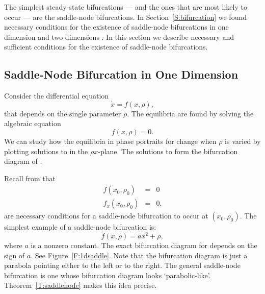 \documentclass{ximera}
\begin{document}
\label{S:SNB}
  


The simplest steady-state bifurcations --- and the ones that are most
likely to occur --- are the saddle-node bifurcations.  In 
Section~\ref{S:bifurcation} we found necessary conditions for the existence 
of saddle-node bifurcations in one dimension  and two 
dimensions .  In this section we describe necessary and 
sufficient conditions for the existence of saddle-node bifurcations.


\subsection*{Saddle-Node Bifurcation in One Dimension}

Consider the differential equation 
\begin{equation} \label{e:1dbif}
\dot{x} = f(x,\rho),
\end{equation}
that depends on the single parameter $\rho$.  The equilibria are 
found by solving the algebraic equation 
\begin{equation} \label{e:1dstst}
f(x,\rho) = 0.
\end{equation}
We can study how the equilibria in phase portraits for  
change when $\rho$ is varied by plotting
solutions to  in the $\rho x$-plane.  The solutions to
 form the bifurcation diagram of .

Recall from  that  
\begin{equation}  \label{e:1dbifcond}
\begin{array}{rcl}
f(x_0,\rho_0) & = & 0 \\
f_x(x_0,\rho_0) & = & 0.
\end{array}
\end{equation}
are necessary conditions for a saddle-node bifurcation to occur at
$(x_0,\rho_0)$.  The simplest example of a saddle-node bifurcation is:
\begin{equation}  \label{e:1dsaddlenf}
f(x,\rho) = a x^2 + \rho,
\end{equation}
where $a$ is a nonzero constant.  The exact bifurcation diagram for 
 depends on the sign of $a$.  See Figure~\ref{F:1dsaddle}.  
Note that the bifurcation diagram is just a parabola pointing either to the 
left or to the right.  The general saddle-node bifurcation is one whose 
bifurcation diagram looks `parabolic-like'.  Theorem~\ref{T:saddlenode}
makes this idea precise.
\end{document}
